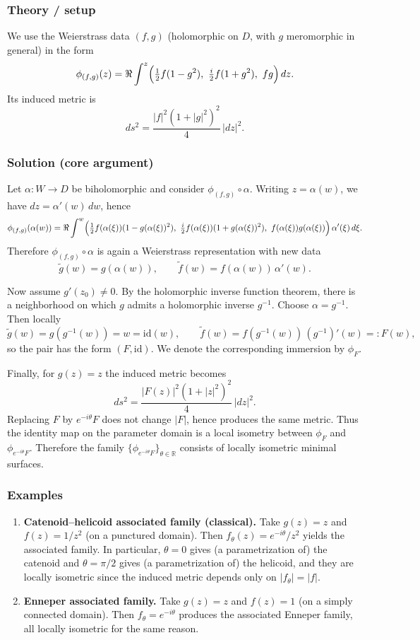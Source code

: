 \documentclass[12pt,a4paper]{article}
\theoremstyle{plain}
\theoremstyle{definition}      %
\begin{document}
\medskip

\subsubsection*{Theory / setup}
We use the Weierstrass data $(f,g)$ (holomorphic on $D$, with $g$ meromorphic in general) in the form
\[
\phi_{(f,g)}(z)
=
\Re\int^z
\Bigl(\tfrac12 f(1-g^2),\ \tfrac{i}{2}f(1+g^2),\ fg\Bigr)\,dz.
\]
Its induced metric is
\[
ds^2
=
\frac{|f|^2(1+|g|^2)^2}{4}\,|dz|^2.
\]

\medskip

\subsubsection*{Solution (core argument)}
Let $\alpha:W\to D$ be biholomorphic and consider $\phi_{(f,g)}\circ\alpha$. Writing $z=\alpha(w)$, we have
$dz=\alpha'(w)\,dw$, hence
\[
\phi_{(f,g)}(\alpha(w))
=
\Re\int^w
\Bigl(\tfrac12 f(\alpha(\xi))(1-g(\alpha(\xi))^2),\ \tfrac{i}{2}f(\alpha(\xi))(1+g(\alpha(\xi))^2),\ f(\alpha(\xi))g(\alpha(\xi))\Bigr)
\,\alpha'(\xi)\,d\xi.
\]
Therefore $\phi_{(f,g)}\circ\alpha$ is again a Weierstrass representation with new data
\[
\tilde g(w)=g(\alpha(w)),\qquad
\tilde f(w)=f(\alpha(w))\,\alpha'(w).
\]

Now assume $g'(z_0)\neq 0$. By the holomorphic inverse function theorem, there is a neighborhood on which $g$ admits a
holomorphic inverse $g^{-1}$. Choose $\alpha=g^{-1}$. Then locally
\[
\tilde g(w)=g(g^{-1}(w))=w=\mathrm{id}(w),
\qquad
\tilde f(w)= f(g^{-1}(w))\,(g^{-1})'(w)=:F(w),
\]
so the pair has the form $(F,\mathrm{id})$. We denote the corresponding immersion by $\phi_F$.

Finally, for $g(z)=z$ the induced metric becomes
\[
ds^2=\frac{|F(z)|^2(1+|z|^2)^2}{4}\,|dz|^2.
\]
Replacing $F$ by $e^{-i\theta}F$ does not change $|F|$, hence produces the same metric. Thus the identity map on the
parameter domain is a local isometry between $\phi_F$ and $\phi_{e^{-i\theta}F}$. Therefore the family
$\{\phi_{e^{-i\theta}F}\}_{\theta\in\mathbb{R}}$ consists of locally isometric minimal surfaces.

\medskip

\subsubsection*{Examples}
\begin{enumerate}
	\item \textbf{Catenoid--helicoid associated family (classical).}
	Take $g(z)=z$ and $f(z)=1/z^2$ (on a punctured domain). Then $f_\theta(z)=e^{-i\theta}/z^2$ yields the associated family.
	In particular, $\theta=0$ gives (a parametrization of) the catenoid and $\theta=\pi/2$ gives (a parametrization of) the
	helicoid, and they are locally isometric since the induced metric depends only on $|f_\theta|=|f|$.
	
	\item \textbf{Enneper associated family.}
	Take $g(z)=z$ and $f(z)=1$ (on a simply connected domain). Then $f_\theta=e^{-i\theta}$ produces the associated Enneper
	family, all locally isometric for the same reason.
\end{enumerate}
\end{document}
